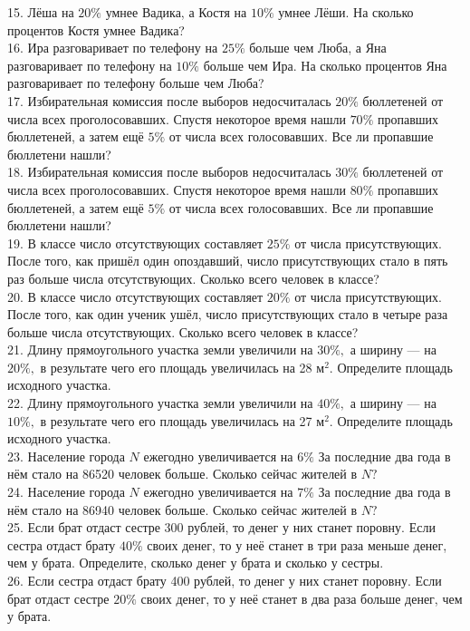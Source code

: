 \documentclass[12pt]{article}
\begin{document}
15. Лёша на $20\%$ умнее Вадика, а Костя на $10\%$ умнее Лёши. На сколько процентов Костя умнее Вадика?\\
16. Ира разговаривает по телефону на $25\%$ больше чем Люба, а Яна разговаривает по телефону на $10\%$ больше чем Ира. На сколько процентов Яна разговаривает по телефону больше чем Люба?\\
17. Избирательная комиссия после выборов недосчиталась $20\%$ бюллетеней от числа всех
проголосовавших. Спустя некоторое время нашли $70\%$ пропавших бюллетеней, а затем
ещё $5\%$ от числа всех голосовавших. Все ли пропавшие бюллетени нашли?\\
18. Избирательная комиссия после выборов недосчиталась $30\%$ бюллетеней от числа всех
проголосовавших. Спустя некоторое время нашли $80\%$ пропавших бюллетеней, а затем
ещё $5\%$ от числа всех голосовавших. Все ли пропавшие бюллетени нашли? \\
19. В классе число отсутствующих составляет $25\%$ от числа присутствующих. После того, как пришёл один опоздавший, число присутствующих стало в пять раз больше числа отсутствующих. Сколько всего человек в классе?\\
20. В классе число отсутствующих составляет $20\%$ от числа присутствующих. После того, как один ученик ушёл, число присутствующих стало в четыре раза больше числа отсутствующих. Сколько всего человек в классе?\\
21. Длину прямоугольного участка земли увеличили на $30\%,$ а ширину --- на $20\%,$ в результате чего его площадь увеличилась на 28 $\text{м}^2.$ Определите площадь исходного участка.\\
22. Длину прямоугольного участка земли увеличили на $40\%,$ а ширину --- на $10\%,$ в результате чего его площадь увеличилась на 27 $\text{м}^2.$ Определите площадь исходного участка.\\
23. Население города $N$ ежегодно увеличивается на $6\%$ За последние два года в нём стало на 86520 человек больше. Сколько сейчас жителей в $N?$\\
24. Население города $N$ ежегодно увеличивается на $7\%$ За последние два года в нём стало на 86940 человек больше. Сколько сейчас жителей в $N?$\\
25. Если брат отдаст сестре 300 рублей, то денег у них станет поровну. Если сестра отдаст брату $40\%$ своих денег, то у неё станет в три раза меньше денег, чем у брата.
Определите, сколько денег у брата и сколько у сестры.\\
26. Если сестра отдаст брату 400 рублей, то денег у них станет поровну. Если брат отдаст сестре $20\%$ своих денег, то у неё станет в два раза больше денег, чем у брата.
\end{document}
